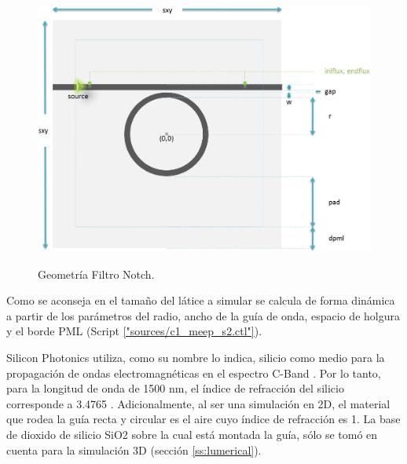 \begin{figure}[H]
\caption{Geometría Filtro Notch.}
\centering
\includegraphics[width=1.0\textwidth,natwidth=892,natheight=663]{figs/notch_v2.jpg}
\label{fig:notch_geometry}
\end{figure}

Como se aconseja en \cite{MIT_tuto} 
el tamaño del látice a simular se calcula 
de forma dinámica a partir de los parámetros del radio, ancho de la guía de onda, 
espacio de holgura y el borde PML (Script \ref{"sources/c1_meep_s2.ctl"}). 

Silicon Photonics utiliza, como su nombre lo indica, silicio como medio para la propagación de ondas electromagnéticas en el espectro C-Band . 
Por lo tanto, para la longitud de onda de 1500 nm, el índice de refracción del silicio corresponde a 3.4765 \cite{bass2009handbook}. 
Adicionalmente, al ser una simulación en 2D, el material que rodea la guía recta y circular es el aire cuyo índice de refracción es 1. 
La base de dioxido de silicio SiO2 sobre la cual está montada la guía, sólo se tomó en cuenta para la simulación 3D (sección \ref{ss:lumerical}).


